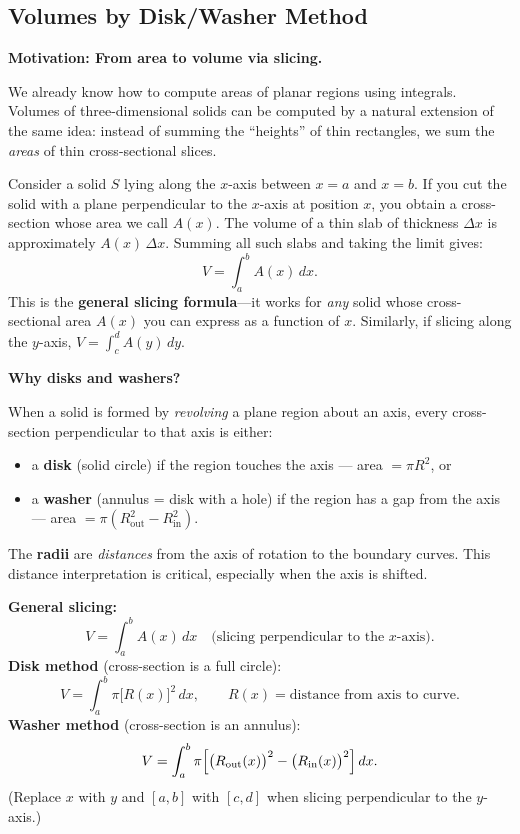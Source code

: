 \newpage
\subsection{Volumes by Disk/Washer Method}

\textbf{Motivation: From area to volume via slicing.}

We already know how to compute areas of planar regions using integrals. Volumes of three-dimensional solids can be computed by a natural extension of the same idea: instead of summing the ``heights'' of thin rectangles, we sum the \emph{areas} of thin cross-sectional slices.

Consider a solid $S$ lying along the $x$-axis between $x=a$ and $x=b$. If you cut the solid with a plane perpendicular to the $x$-axis at position $x$, you obtain a cross-section whose area we call $A(x)$. The volume of a thin slab of thickness $\Delta x$ is approximately $A(x)\,\Delta x$. Summing all such slabs and taking the limit gives:
\[
V=\int_a^b A(x)\,dx.
\]
This is the \textbf{general slicing formula}---it works for \emph{any} solid whose cross-sectional area $A(x)$ you can express as a function of $x$. Similarly, if slicing along the $y$-axis, $V=\int_c^d A(y)\,dy$.

\vspace{0.5em}
\textbf{Why disks and washers?}

When a solid is formed by \emph{revolving} a plane region about an axis, every cross-section perpendicular to that axis is either:
\begin{itemize}[leftmargin=*]
\item a \textbf{disk} (solid circle) if the region touches the axis --- area $= \pi R^2$, or
\item a \textbf{washer} (annulus = disk with a hole) if the region has a gap from the axis --- area $= \pi(R_{\text{out}}^2 - R_{\text{in}}^2)$.
\end{itemize}

The \textbf{radii} are \emph{distances} from the axis of rotation to the boundary curves. This distance interpretation is critical, especially when the axis is shifted.

\begin{keyformula}[title={Key Formula: General Slicing and Disk/Washer Method}]
\textbf{General slicing:}
\[
V=\int_a^b A(x)\,dx \quad\text{(slicing perpendicular to the $x$-axis)}.
\]
\textbf{Disk method} (cross-section is a full circle):
\[
V=\int_a^b \pi\bigl[R(x)\bigr]^2\,dx,\qquad R(x)=\text{distance from axis to curve}.
\]
\textbf{Washer method} (cross-section is an annulus):
\[
V=\int_a^b \pi\Bigl[\bigl(R_{\text{out}}(x)\bigr)^2-\bigl(R_{\text{in}}(x)\bigr)^2\Bigr]\,dx.
\]
(Replace $x$ with $y$ and $[a,b]$ with $[c,d]$ when slicing perpendicular to the $y$-axis.)
\end{keyformula}

